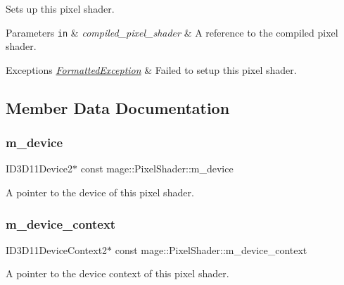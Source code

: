 Sets up this pixel shader.


\begin{DoxyParams}[1]{Parameters}
\mbox{\tt in}  & {\em compiled\+\_\+pixel\+\_\+shader} & A reference to the compiled pixel shader. \\
\hline
\end{DoxyParams}

\begin{DoxyExceptions}{Exceptions}
{\em \hyperlink{structmage_1_1_formatted_exception}{Formatted\+Exception}} & Failed to setup this pixel shader. \\
\hline
\end{DoxyExceptions}


\subsection{Member Data Documentation}
\hypertarget{classmage_1_1_pixel_shader_a7fa34f27d8f39db2403edac28ddecc68}{}\label{classmage_1_1_pixel_shader_a7fa34f27d8f39db2403edac28ddecc68} 
\subsubsection{\texorpdfstring{m\+\_\+device}{m\_device}}
{\footnotesize\ttfamily I\+D3\+D11\+Device2$\ast$ const mage\+::\+Pixel\+Shader\+::m\+\_\+device\hspace{0.3cm}{\ttfamily [protected]}}

A pointer to the device of this pixel shader. \hypertarget{classmage_1_1_pixel_shader_a6b9bbf18f255b061fb75453f32a78720}{}\label{classmage_1_1_pixel_shader_a6b9bbf18f255b061fb75453f32a78720} 
\subsubsection{\texorpdfstring{m\+\_\+device\+\_\+context}{m\_device\_context}}
{\footnotesize\ttfamily I\+D3\+D11\+Device\+Context2$\ast$ const mage\+::\+Pixel\+Shader\+::m\+\_\+device\+\_\+context\hspace{0.3cm}{\ttfamily [protected]}}

A pointer to the device context of this pixel shader. \hypertarget{classmage_1_1_pixel_shader_a1dd0f87be1c1f7fe5a1bb2737263222f}{}\label{classmage_1_1_pixel_shader_a1dd0f87be1c1f7fe5a1bb2737263222f} 
